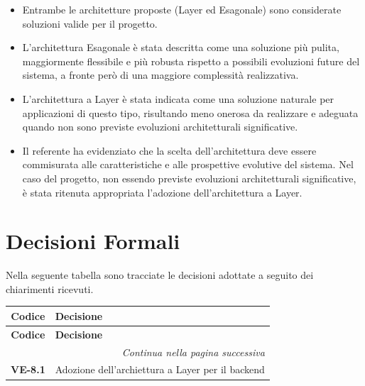 \begin{itemize}

\item Entrambe le architetture proposte (Layer ed Esagonale) sono considerate soluzioni valide per il progetto.

\item L'architettura Esagonale è stata descritta come una soluzione più pulita, maggiormente 
flessibile e più robusta rispetto a possibili evoluzioni future del sistema, a fronte però
 di una maggiore complessità realizzativa.

\item L'architettura a Layer è stata indicata come una soluzione naturale per applicazioni di 
questo tipo, risultando meno onerosa da realizzare e adeguata quando non sono previste 
evoluzioni architetturali significative.

\item Il referente ha evidenziato che la scelta dell'architettura deve essere commisurata 
alle caratteristiche e alle prospettive evolutive del sistema. Nel caso del progetto, 
non essendo previste evoluzioni architetturali significative, è stata ritenuta appropriata 
l'adozione dell'architettura a Layer.
\end{itemize}

\newpage
\section{Decisioni Formali}
Nella seguente tabella sono tracciate le decisioni adottate a seguito
dei chiarimenti ricevuti.

\renewcommand{\arraystretch}{1.3}
\vspace{-0.3cm}
\noindent
\begin{longtable}{c p{12cm}}
	\toprule
	\textbf{Codice} & \textbf{Decisione} \\
	\midrule
	\endfirsthead

	\toprule
	\textbf{Codice} & \textbf{Decisione} \\
	\midrule
	\endhead

	\midrule
	\multicolumn{2}{r}{\textit{Continua nella pagina successiva}} \\
	\midrule
	\endfoot

	\bottomrule
	\endlastfoot

	\textbf{VE-8.1}
		& Adozione dell'archiettura a Layer per il backend \\[4pt]
\end{longtable}

